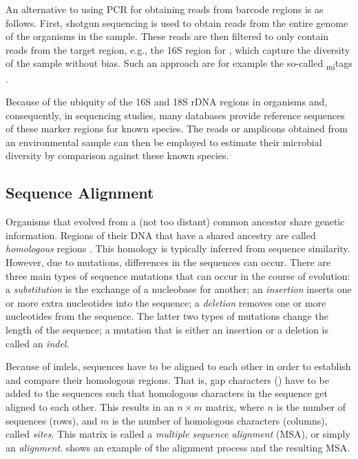 An alternative to using PCR for obtaining reads from barcode regions is as follows.
First, shotgun sequencing is used to obtain reads from the entire genome of the organisms in the sample.
These reads are then filtered to only contain reads from the target region, e.g., the 16S region for ,
which capture the diversity of the sample without bias.
Such an approach are for example the so-called \textsubscript{mi}tags \citep{Logares2014}.

Because of the ubiquity of the 16S and 18S rDNA regions in organisms and, consequently, in sequencing studies,
many databases provide reference sequences of these marker regions for known species.
The reads or amplicons obtained from an environmental sample can then be employed
to estimate their microbial diversity by comparison against these known species.


\subsection{Sequence Alignment}
\label{ch:Foundations:sec:SequenceAnalysis:sub:SequenceAlignment}

Organisms that evolved from a (not too distant) common ancestor share genetic information.
Regions of their DNA that have a shared ancestry are called \emph{homologous} regions \cite{Koonin2005}.
This homology is typically inferred from sequence similarity. %
However, due to mutations, differences in the sequences can occur.
There are three main types of sequence mutations that can occur in the course of evolution:
a \emph{substitution} is the exchange of a nucleobase for another;
an \emph{insertion} inserts one or more extra nucleotides into the sequence;
a \emph{deletion} removes one or more nucleotides from the sequence.
The latter two types of mutations change the length of the sequence;
a mutation that is either an insertion or a deletion is called an \emph{indel}.

Because of indels, sequences have to be aligned to each other in order to establish and compare their homologous regions.
That is, gap characters (\nucleobase{-}) have to be added to the sequences
such that homologous characters in the sequence get aligned to each other.
This results in an $n \times m$ matrix,
where $n$ is the number of sequences (rows),
and $m$ is the number of homologous characters (columns), called \emph{sites}.
This matrix is called a \emph{multiple sequence alignment} (MSA), or simply an \emph{alignment}.
 shows an example of the alignment process and the resulting MSA.

